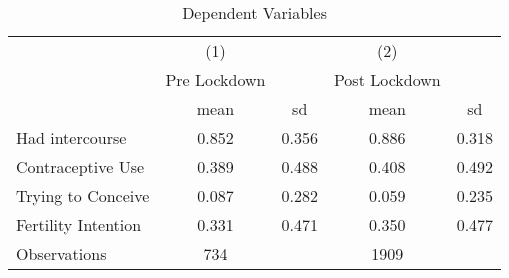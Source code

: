 \begin{table}[htbp]\centering
\def\sym#1{\ifmmode^{#1}\else\(^{#1}\)\fi}
\caption{Dependent Variables}
\begin{tabular}{l*{2}{cc}}
\hline\hline
                    &\multicolumn{1}{c}{(1)}&            &\multicolumn{1}{c}{(2)}&            \\
                    &Pre Lockdown&            &Post Lockdown&            \\
                    &        mean&          sd&        mean&          sd\\
\hline
Had intercourse     &       0.852&       0.356&       0.886&       0.318\\
Contraceptive Use   &       0.389&       0.488&       0.408&       0.492\\
Trying to Conceive  &       0.087&       0.282&       0.059&       0.235\\
Fertility Intention &       0.331&       0.471&       0.350&       0.477\\
\hline
Observations        &         734&            &        1909&            \\
\hline\hline
\end{tabular}
\end{table}
